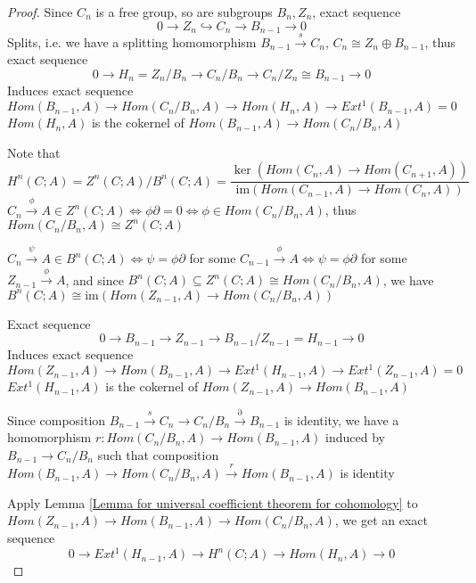 \documentclass[main]{subfiles}
\begin{document}
\begin{proof}
Since $C_n$ is a free group, so are subgroups $B_n,Z_n$, exact sequence
\[0\to Z_n\hookrightarrow C_n\to B_{n-1}\to0\]
Splits, i.e. we have a splitting homomorphism $B_{n-1}\xrightarrow{s}C_n$, $C_n\cong Z_n\oplus B_{n-1}$, thus exact sequence
\[0\to H_n=Z_n/B_n\to C_n/B_n\to C_n/Z_n\cong B_{n-1}\to0\]
Induces exact sequence
\[Hom(B_{n-1},A)\to Hom(C_n/B_n,A)\to Hom(H_n,A)\to Ext^1(B_{n-1},A)=0\]
$Hom(H_n,A)$ is the cokernel of $Hom(B_{n-1},A)\to Hom(C_n/B_n,A)$ \par
Note that
\[H^n(C;A)=Z^n(C;A)/B^n(C;A)=\dfrac{\ker(Hom(C_n,A)\to Hom(C_{n+1},A))}{\mathrm{im}(Hom(C_{n-1},A)\to Hom(C_n,A))}\]
$C_n\xrightarrow{\phi} A\in Z^n(C;A)\Leftrightarrow\phi\partial=0\Leftrightarrow\phi\in Hom(C_n/B_n,A)$, thus $Hom(C_n/B_n,A)\cong Z^n(C;A)$
\begin{center}
\end{center}
$C_n\xrightarrow{\psi} A\in B^n(C;A)\Leftrightarrow\psi=\phi\partial$ for some $C_{n-1}\xrightarrow{\phi} A\Leftrightarrow\psi=\phi\partial$ for some $Z_{n-1}\xrightarrow{\phi} A$, and since $B^n(C;A)\subseteq Z^n(C;A)\cong Hom(C_n/B_n,A)$, we have $B^n(C;A)\cong\mathrm{im}(Hom(Z_{n-1},A)\to Hom(C_n/B_n,A))$
\begin{center}
\end{center}
Exact sequence
\[0\to B_{n-1}\to Z_{n-1}\to B_{n-1}/Z_{n-1}=H_{n-1}\to0\]
Induces exact sequence
\[Hom(Z_{n-1},A)\to Hom(B_{n-1},A)\to Ext^1(H_{n-1},A)\to Ext^1(Z_{n-1},A)=0\]
$Ext^1(H_{n-1},A)$ is the cokernel of $Hom(Z_{n-1},A)\to Hom(B_{n-1},A)$ \par
Since composition $B_{n-1}\xrightarrow{s}C_n\to C_n/B_n\xrightarrow{\partial}B_{n-1}$ is identity, we have a homomorphism $r:Hom(C_n/B_n,A)\to Hom(B_{n-1},A)$ induced by $B_{n-1}\to C_n/B_n$ such that composition $Hom(B_{n-1},A)\to Hom(C_n/B_n,A)\xrightarrow{r} Hom(B_{n-1},A)$ is identity \par
Apply Lemma \ref{Lemma for universal coefficient theorem for cohomology} to $Hom(Z_{n-1},A)\to Hom(B_{n-1},A)\to Hom(C_n/B_n,A)$, we get an exact sequence
\[0\to Ext^1(H_{n-1},A)\to H^n(C;A)\to Hom(H_n,A)\to0\]
\end{proof}
\end{document}
